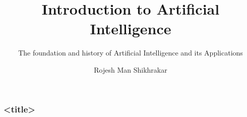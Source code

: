 \documentclass{beamer}
\title{Introduction to Artificial Intelligence}
\subtitle{The foundation and history of Artificial Intelligence and its Applications}
\author[RMS]{Rojesh Man Shikhrakar}
\begin{document}
\maketitle

\begin{frame}
  \frametitle{<title>}

  

\end{frame}
\end{document}
